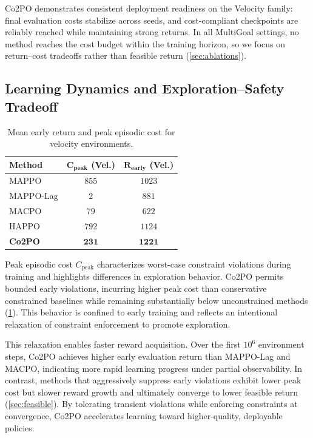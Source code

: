 \documentclass{article}
\theoremstyle{plain}
\theoremstyle{definition}
\theoremstyle{remark}
\begin{document}
Co2PO demonstrates consistent deployment readiness on the Velocity family: final evaluation costs stabilize across seeds, and cost-compliant checkpoints are reliably reached while maintaining strong returns. 
In all MultiGoal settings, no method reaches the cost budget within the training horizon, so we focus on return--cost tradeoffs rather than feasible return (\cref{sec:ablations}).

\subsection{Learning Dynamics and Exploration--Safety Tradeoff}
\begin{table}[h!]
  \caption{Mean early return and peak episodic cost for velocity environments.}
  \label{tab:exploration_safety_tradeoff}
  \centering
  \begin{small}
  \setlength{\tabcolsep}{6pt}
  \begin{tabular}{l c c}
    \toprule
    \textbf{Method} & $\boldsymbol{C_{\text{peak}}}$ (Vel.) & $\boldsymbol{R_{\text{early}}}$ (Vel.) \\
    \midrule
    MAPPO & $855$ & $1023$ \\
    MAPPO-Lag & $2$ & $881$ \\
    MACPO & $79$ & $622$ \\
    HAPPO & $792$ & $1124$ \\
    \midrule
    \textbf{Co2PO} & $\boldsymbol{231}$ & $\boldsymbol{1221}$ \\
    \bottomrule
  \end{tabular}
  \end{small}
  \vskip -0.08in
\end{table} 


Peak episodic cost $C_{\text{peak}}$ characterizes worst-case constraint violations during training and highlights differences in exploration behavior. 
Co2PO permits bounded early violations, incurring higher peak cost than conservative constrained baselines while remaining substantially below unconstrained methods (\cref{tab:exploration_safety_tradeoff}). 
This behavior is confined to early training and reflects an intentional relaxation of constraint enforcement to promote exploration.

This relaxation enables faster reward acquisition. 
Over the first $10^6$ environment steps, Co2PO achieves higher early evaluation return than MAPPO-Lag and MACPO, indicating more rapid learning progress under partial observability. 
In contrast, methods that aggressively suppress early violations exhibit lower peak cost but slower reward growth and ultimately converge to lower feasible return (\cref{sec:feasible}). 
By tolerating transient violations while enforcing constraints at convergence, Co2PO accelerates learning toward higher-quality, deployable policies.
\end{document}
